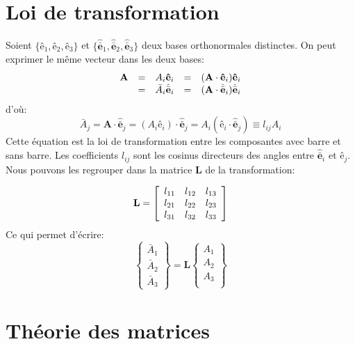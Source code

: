 \section{Loi de transformation}
Soient $\{\textbf{ê}_1, \textbf{ê}_2, \textbf{ê}_3\}$ et $\{\hat{\bar{\textbf{e}}}_1, \hat{\bar{\textbf{e}}}_2, \hat{\bar{\textbf{e}}}_3\}$ deux bases orthonormales distinctes. On peut exprimer le même vecteur dans les deux bases:
$$\begin{array}{c c c c c}
\textbf{A} &=& A_i\textbf{ê}_i &=& (\textbf{A}\cdot \textbf{ê}_i)\textbf{ê}_i\\
 &=& \bar{A}_i\hat{\bar{\textbf{e}}}_i &=& (\textbf{A}\cdot \hat{\bar{\textbf{e}}}_i)\hat{\bar{\textbf{e}}}_i\\
\end{array}$$
d'où:  $$\bar{A}_j=\textbf{A}\cdot\hat{\bar{\textbf{e}}}_j=(A_i\textbf{ê}_i)\cdot\hat{\bar{\textbf{e}}}_j=A_i(\textbf{ê}_i\cdot\hat{\bar{\textbf{e}}}_j)\equiv l_{ij}A_i$$
Cette équation est la loi de transformation entre les composantes avec barre et sans barre. Les coefficients $l_{ij}$ sont les cosinus directeurs des angles entre $\hat{\bar{\textbf{e}}}_i$ et $\textbf{ê}_j$. Nous pouvons les regrouper dans la matrice \textbf{L} de la transformation:

$$\textbf{L}= \left[
\begin{array}{c c c}
l_{11}& l_{12}& l_{13} \\
l_{21}& l_{22}& l_{23}\\
l_{31}& l_{32}& l_{33}\\
\end{array}\right]$$
Ce qui permet d'écrire: 
$$\left\{
\begin{array}{c}
\bar{A}_1\\
\bar{A}_2\\
\bar{A}_3
\end{array}\right\} = \textbf{L} \left\{\begin{array}{c}
A_1\\
A_2\\
A_3\\
\end{array}\right\}$$

\section{Théorie des matrices}
